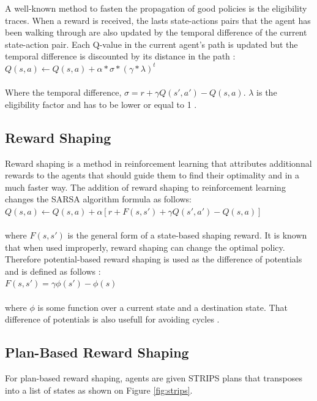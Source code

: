 \documentclass[letterpaper]{article}
\begin{document}
A well-known method to fasten the propagation of good policies is the eligibility traces. When a reward is received, the lasts state-actions pairs that the agent has been walking through are also updated by the temporal difference of the current state-action pair. Each Q-value in the current agent's path is updated but the temporal difference is discounted by its distance in the path : \\

$Q(s, a) \leftarrow  Q(s, a) +  \alpha *  \sigma *  (\gamma * \lambda)^t$\\\\
Where the temporal difference, $ \sigma = r + \gamma Q(s', a') - Q(s,a)$. $\lambda$ is the eligibility factor and has to be lower or equal to 1 \citep{etrace}.

\subsection{Reward Shaping}

Reward shaping is a method in reinforcement learning that attributes additionnal rewards to the agents that should guide them to find their optimality and in a much faster way.
The addition of reward shaping to reinforcement learning changes the SARSA algorithm formula as follows: \\

$Q(s, a) \leftarrow  Q(s, a) +  \alpha [r + F(s, s') + \gamma Q(s', a') - Q(s,a)]$\\\\
where $ F(s, s')$  is the general form of a state-based shaping reward. It is known that when used improperly, reward shaping can change the optimal policy. Therefore potential-based reward shaping is used as the difference of potentials and is defined as follows : \\

$F(s, s') =\gamma \phi (s') - \phi (s)$\\\\
where $\phi$ is some function over a current state and a destination state. That difference of potentials is also usefull for avoiding cycles  \citep{rs2}.

\subsection{Plan-Based Reward Shaping}

For plan-based reward shaping, agents are given STRIPS plans that transposes into a list of states as shown on  Figure \ref{fig:strips}. 
\end{document}
